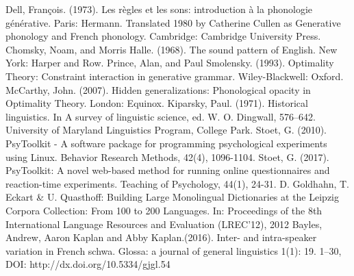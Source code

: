 \documentclass{article}
\begin{document}
\begin{thebibliography}{} %
Dell, François. (1973). Les règles et les sons: introduction à la phonologie générative. Paris: Hermann. Translated 1980 by Catherine Cullen as Generative phonology and French phonology. Cambridge: Cambridge University Press.
Chomsky, Noam, and Morris Halle. (1968). The sound pattern of English. New York: Harper and Row.
Prince, Alan, and Paul Smolensky.  (1993). Optimality Theory: Constraint interaction in generative grammar. Wiley-Blackwell: Oxford.
McCarthy, John. (2007). Hidden generalizations: Phonological opacity in Optimality Theory. London: Equinox.
Kiparsky, Paul. (1971). Historical linguistics. In A survey of linguistic science, ed. W. O. Dingwall, 576–642. University of Maryland Linguistics Program, College Park.
Stoet, G. (2010). PsyToolkit - A software package for programming psychological experiments using Linux. 	Behavior Research Methods, 42(4), 1096-1104.  
Stoet, G. (2017). PsyToolkit: A novel web-based method for running online questionnaires and reaction-time experiments. Teaching of Psychology, 44(1), 24-31.
D. Goldhahn, T. Eckart \& U. Quasthoff: Building Large Monolingual Dictionaries at the Leipzig Corpora Collection: From 100 to 200 Languages.
In: Proceedings of the 8th International Language Resources and Evaluation (LREC'12), 2012
Bayles, Andrew, Aaron Kaplan and Abby Kaplan.(2016). Inter- and intra-speaker variation in French schwa. Glossa: a journal of general linguistics 1(1): 19. 1–30, DOI: http://dx.doi.org/10.5334/gjgl.54
\end{thebibliography}
\end{document}
